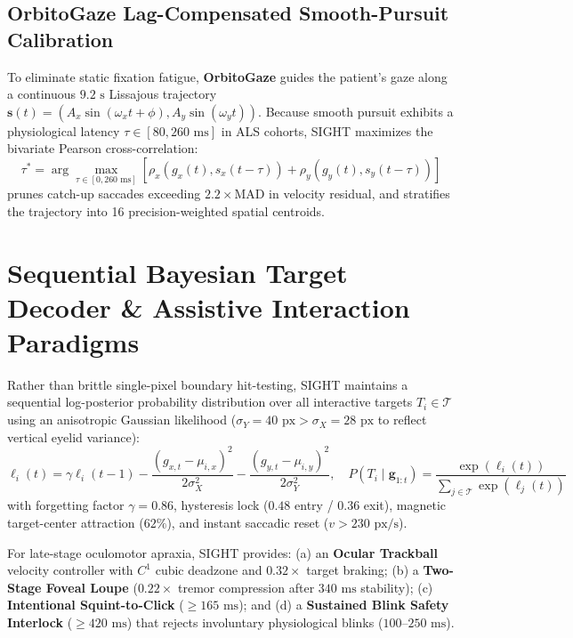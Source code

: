 \documentclass[twocolumn,10pt]{article}
\begin{document}
\subsection{OrbitoGaze Lag-Compensated Smooth-Pursuit Calibration}
To eliminate static fixation fatigue, \textbf{OrbitoGaze} guides the patient's gaze along a continuous $9.2\text{ s}$ Lissajous trajectory $\mathbf{s}(t) = (A_x \sin(\omega_x t + \phi), A_y \sin(\omega_y t))$. Because smooth pursuit exhibits a physiological latency $\tau \in [80, 260\text{ ms}]$ in ALS cohorts, SIGHT maximizes the bivariate Pearson cross-correlation:
\begin{equation}
\tau^* = \arg\max_{\tau \in [0, 260\text{ ms}]} \left[\rho_x\!\left(g_x(t), s_x(t - \tau)\right) + \rho_y\!\left(g_y(t), s_y(t - \tau)\right)\right]
\end{equation}
prunes catch-up saccades exceeding $2.2\times\text{MAD}$ in velocity residual, and stratifies the trajectory into 16 precision-weighted spatial centroids.

\section{Sequential Bayesian Target Decoder \& Assistive Interaction Paradigms}
\label{sec:bayesian}
Rather than brittle single-pixel boundary hit-testing, SIGHT maintains a sequential log-posterior probability distribution over all interactive targets $T_i \in \mathcal{T}$ using an anisotropic Gaussian likelihood ($\sigma_Y = 40\text{ px} > \sigma_X = 28\text{ px}$ to reflect vertical eyelid variance):
\begin{equation}
\ell_i(t) = \gamma \ell_i(t-1) - \frac{(g_{x,t} - \mu_{i,x})^2}{2\sigma_X^2} - \frac{(g_{y,t} - \mu_{i,y})^2}{2\sigma_Y^2}, \quad P(T_i \mid \mathbf{g}_{1:t}) = \frac{\exp(\ell_i(t))}{\sum_{j \in \mathcal{T}} \exp(\ell_j(t))}
\end{equation}
with forgetting factor $\gamma = 0.86$, hysteresis lock ($0.48$ entry / $0.36$ exit), magnetic target-center attraction ($62\%$), and instant saccadic reset ($v > 230\text{ px/s}$).

For late-stage oculomotor apraxia, SIGHT provides: (a) an \textbf{Ocular Trackball} velocity controller with $C^1$ cubic deadzone and $0.32\times$ target braking; (b) a \textbf{Two-Stage Foveal Loupe} ($0.22\times$ tremor compression after $340\text{ ms}$ stability); (c) \textbf{Intentional Squint-to-Click} ($\ge 165\text{ ms}$); and (d) a \textbf{Sustained Blink Safety Interlock} ($\ge 420\text{ ms}$) that rejects involuntary physiological blinks ($100\text{--}250\text{ ms}$).
\end{document}
